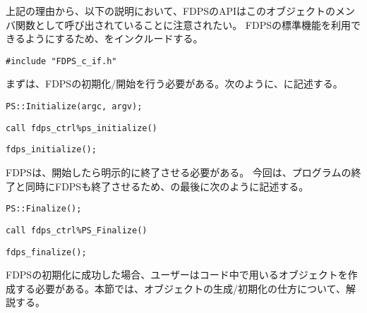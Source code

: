 上記の理由から、以下の説明において、FDPSのAPIはこのオブジェクトのメンバ関数として呼び出されていることに注意されたい。
\endifFtn
\ifC%
FDPSの標準機能を利用できるようにするため、をインクルードする。
\begin{lstlisting}[caption=ヘッダーファイル\texttt{FDPS\_c\_if.h}のインクルード]
#include "FDPS_c_if.h"
\end{lstlisting}
\endifC


まずは、FDPSの初期化/開始を行う必要がある。次のように、\mainFunc に記述する。
\ifCpp%
\begin{lstlisting}[caption=FDPSの開始]
PS::Initialize(argc, argv);
\end{lstlisting}
\endifCpp
\ifFtn%
\begin{lstlisting}[caption=FDPSの開始]
call fdps_ctrl%ps_initialize()
\end{lstlisting}
\endifFtn
\ifC%
\begin{lstlisting}[caption=FDPSの開始]
fdps_initialize();
\end{lstlisting}
\endifC

FDPSは、開始したら明示的に終了させる必要がある。
今回は、プログラムの終了と同時にFDPSも終了させるため、\mainFunc の最後に次のように記述する。
\ifCpp%
\begin{lstlisting}[caption=FDPSの終了]
PS::Finalize();
\end{lstlisting}
\endifCpp
\ifFtn %
\begin{lstlisting}[caption=FDPSの終了]
call fdps_ctrl%PS_Finalize()
\end{lstlisting}
\endifFtn
\ifC %
\begin{lstlisting}[caption=FDPSの終了]
fdps_finalize();
\end{lstlisting}
\endifC

FDPSの初期化に成功した場合、ユーザーはコード中で用いるオブジェクトを作成する必要がある。本節では、オブジェクトの生成/初期化の仕方について、解説する。

